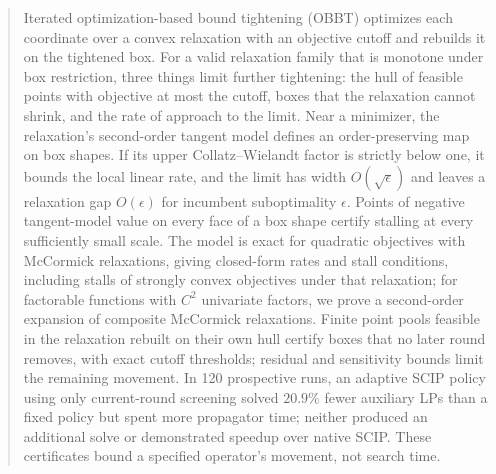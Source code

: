 \begin{abstract}
Iterated optimization-based bound tightening (OBBT) optimizes each
coordinate over a convex relaxation with an objective cutoff and rebuilds
it on the tightened box. For a valid relaxation family that is monotone
under box restriction, three things limit further tightening: the hull of
feasible points with objective at most the cutoff, boxes that the
relaxation cannot shrink, and the rate of approach to the limit. Near a
minimizer, the relaxation's second-order tangent model defines an
order-preserving map on box shapes. If its upper Collatz--Wielandt factor
is strictly below one, it bounds the local linear rate, and the limit has
width $O(\sqrt\epsilon)$ and leaves a relaxation gap $O(\epsilon)$ for
incumbent suboptimality $\epsilon$. Points of negative tangent-model value
on every face of a box shape certify stalling at every sufficiently small
scale. The model is exact for quadratic objectives with McCormick
relaxations, giving closed-form rates and stall conditions, including
stalls of strongly convex objectives under that relaxation; for factorable
functions with $C^2$ univariate factors, we prove a second-order expansion
of composite McCormick relaxations. Finite point pools feasible in the
relaxation rebuilt on their own hull certify boxes that no later round
removes, with exact cutoff thresholds; residual and sensitivity bounds
limit the remaining movement. In 120 prospective runs, an adaptive SCIP
policy using only current-round screening solved $20.9\%$ fewer auxiliary
LPs than a fixed policy but spent more propagator time; neither produced an
additional solve or demonstrated speedup over native SCIP. These
certificates bound a specified operator's movement, not search time.
\end{abstract}
